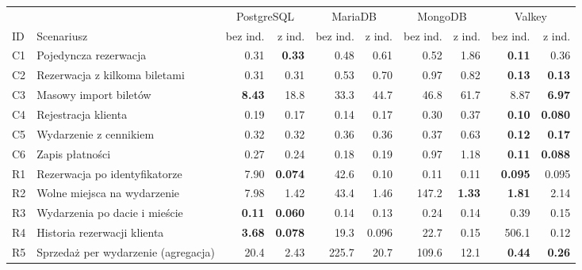\begin{tabular}{llrrrrrrrr}
\toprule
 & & \multicolumn{2}{c}{PostgreSQL} & \multicolumn{2}{c}{MariaDB} & \multicolumn{2}{c}{MongoDB} & \multicolumn{2}{c}{Valkey} \\
\cmidrule(lr){3-4}\cmidrule(lr){5-6}\cmidrule(lr){7-8}\cmidrule(lr){9-10}
ID & Scenariusz & bez ind. & z ind. & bez ind. & z ind. & bez ind. & z ind. & bez ind. & z ind. \\
\midrule
C1 & Pojedyncza rezerwacja & \num{0.31} & \textbf{\num{0.33}} & \num{0.48} & \num{0.61} & \num{0.52} & \num{1.86} & \textbf{\num{0.11}} & \num{0.36} \\
C2 & Rezerwacja z kilkoma biletami & \num{0.31} & \num{0.31} & \num{0.53} & \num{0.70} & \num{0.97} & \num{0.82} & \textbf{\num{0.13}} & \textbf{\num{0.13}} \\
C3 & Masowy import biletów & \textbf{\num{8.43}} & \num{18.8} & \num{33.3} & \num{44.7} & \num{46.8} & \num{61.7} & \num{8.87} & \textbf{\num{6.97}} \\
C4 & Rejestracja klienta & \num{0.19} & \num{0.17} & \num{0.14} & \num{0.17} & \num{0.30} & \num{0.37} & \textbf{\num{0.10}} & \textbf{\num{0.080}} \\
C5 & Wydarzenie z cennikiem & \num{0.32} & \num{0.32} & \num{0.36} & \num{0.36} & \num{0.37} & \num{0.63} & \textbf{\num{0.12}} & \textbf{\num{0.17}} \\
C6 & Zapis płatności & \num{0.27} & \num{0.24} & \num{0.18} & \num{0.19} & \num{0.97} & \num{1.18} & \textbf{\num{0.11}} & \textbf{\num{0.088}} \\
\midrule
R1 & Rezerwacja po identyfikatorze & \num{7.90} & \textbf{\num{0.074}} & \num{42.6} & \num{0.10} & \num{0.11} & \num{0.11} & \textbf{\num{0.095}} & \num{0.095} \\
R2 & Wolne miejsca na wydarzenie & \num{7.98} & \num{1.42} & \num{43.4} & \num{1.46} & \num{147.2} & \textbf{\num{1.33}} & \textbf{\num{1.81}} & \num{2.14} \\
R3 & Wydarzenia po dacie i mieście & \textbf{\num{0.11}} & \textbf{\num{0.060}} & \num{0.14} & \num{0.13} & \num{0.24} & \num{0.14} & \num{0.39} & \num{0.15} \\
R4 & Historia rezerwacji klienta & \textbf{\num{3.68}} & \textbf{\num{0.078}} & \num{19.3} & \num{0.096} & \num{22.7} & \num{0.15} & \num{506.1} & \num{0.12} \\
R5 & Sprzedaż per wydarzenie (agregacja) & \num{20.4} & \num{2.43} & \num{225.7} & \num{20.7} & \num{109.6} & \num{12.1} & \textbf{\num{0.44}} & \textbf{\num{0.26}} \\

\end{tabular}
